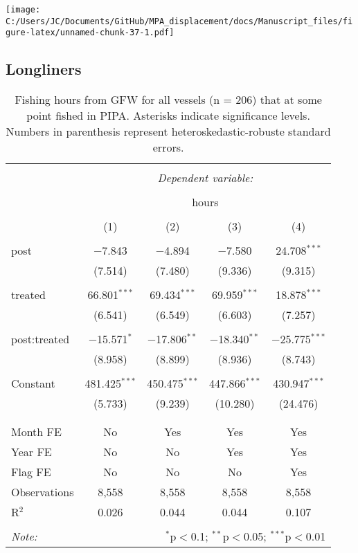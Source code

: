 \documentclass[]{article}
\theoremstyle{definition}
\theoremstyle{definition}
\theoremstyle{definition}
\theoremstyle{remark}
\begin{document}
\texttt{[image: C:/Users/JC/Documents/GitHub/MPA\_displacement/docs/Manuscript\_files/figure-latex/unnamed-chunk-37-1.pdf]}

\subsection{Longliners}\label{longliners}

\begin{table}[!htbp] \centering 
  \caption{\label{tab:all_vessels}Fishing hours from GFW for all vessels (n = 206) that at some point fished in PIPA. Asterisks indicate significance levels. Numbers in parenthesis represent heteroskedastic-robuste standard errors.} 
  \label{} 
\begin{tabular}{@{\extracolsep{5pt}}lcccc} 
\\[-1.8ex]\hline 
\hline \\[-1.8ex] 
 & \multicolumn{4}{c}{\textit{Dependent variable:}} \\ 
\cline{2-5} 
\\[-1.8ex] & \multicolumn{4}{c}{hours} \\ 
\\[-1.8ex] & (1) & (2) & (3) & (4)\\ 
\hline \\[-1.8ex] 
 post & $-$7.843 & $-$4.894 & $-$7.580 & 24.708$^{***}$ \\ 
  & (7.514) & (7.480) & (9.336) & (9.315) \\ 
  & & & & \\ 
 treated & 66.801$^{***}$ & 69.434$^{***}$ & 69.959$^{***}$ & 18.878$^{***}$ \\ 
  & (6.541) & (6.549) & (6.603) & (7.257) \\ 
  & & & & \\ 
 post:treated & $-$15.571$^{*}$ & $-$17.806$^{**}$ & $-$18.340$^{**}$ & $-$25.775$^{***}$ \\ 
  & (8.958) & (8.899) & (8.936) & (8.743) \\ 
  & & & & \\ 
 Constant & 481.425$^{***}$ & 450.475$^{***}$ & 447.866$^{***}$ & 430.947$^{***}$ \\ 
  & (5.733) & (9.239) & (10.280) & (24.476) \\ 
  & & & & \\ 
\hline \\[-1.8ex] 
Month FE & No & Yes & Yes & Yes \\ 
Year FE & No & No & Yes & Yes \\ 
Flag FE & No & No & No & Yes \\ 
Observations & 8,558 & 8,558 & 8,558 & 8,558 \\ 
R$^{2}$ & 0.026 & 0.044 & 0.044 & 0.107 \\ 
\hline 
\hline \\[-1.8ex] 
\textit{Note:}  & \multicolumn{4}{r}{$^{*}$p$<$0.1; $^{**}$p$<$0.05; $^{***}$p$<$0.01} \\ 
\end{tabular} 
\end{table}
\end{document}
